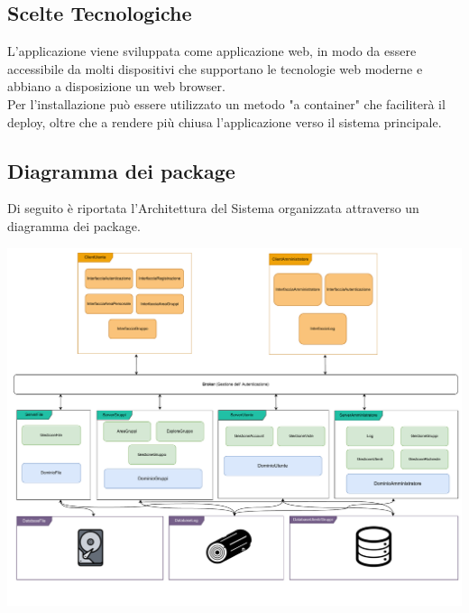 \vspace{0.5cm}

\subsection*{Scelte Tecnologiche}

L'applicazione viene sviluppata come applicazione web, in modo da essere accessibile da molti dispositivi che supportano le tecnologie web moderne e abbiano a disposizione un web browser.
\\
Per l'installazione può essere utilizzato un metodo "a container" che faciliterà il deploy, oltre che a rendere più chiusa l'applicazione verso il sistema principale.

\vspace{0.5cm}

\pagebreak
{}
\subsection*{Diagramma dei package}
Di seguito è riportata l’Architettura del Sistema organizzata attraverso un diagramma dei package.
\vspace{2cm}

\begin{adjustwidth}{-3cm}{0cm}
\includegraphics[scale=0.55]{progettazione/Progettazione-Diagramma Package.drawio.pdf}
\end{adjustwidth}


